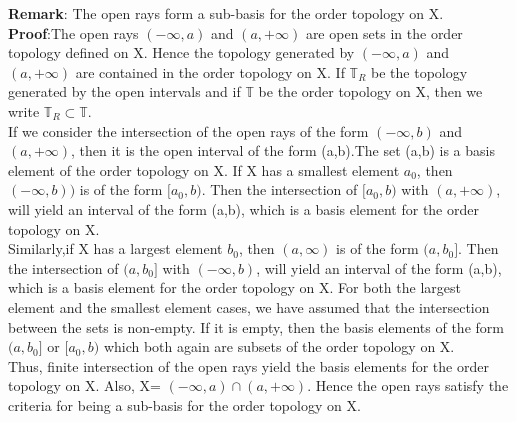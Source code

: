 \documentclass[a4paper,english,12pt]{article}
\begin{document}
\begin{flushleft}
{\bf Remark}: The open rays form a sub-basis for the order topology on X.\\
\vspace{2mm}
{\bf Proof}:The open rays $(-\infty,a)$ and $(a,+\infty)$ are open sets in the order topology defined on X. Hence the topology generated by $(-\infty,a)$ and $(a,+\infty)$ are contained in the order topology on X. If $\mathbb{T}_R$ be the topology generated by the open intervals and if $\mathbb{T}$ be the order topology on X, then we write $ \mathbb{T}_R\subset \mathbb{T}$. \\
\vspace{1mm}
If we consider the intersection of the open rays of the form $(-\infty,b)$ and $(a,+\infty)$, then it is the open interval of the form (a,b).The set (a,b) is a basis element of the order topology on X. If X has a smallest element $a_0$, then $(-\infty,b))$ is of the form $[a_0,b)$. Then the intersection of $[a_0,b)$ with $(a,+\infty)$, will yield an interval of the form (a,b), which is a basis element for the order topology on X. \\
\vspace{1mm}
Similarly,if X has a largest element $b_0$, then $(a,\infty)$ is of the form $(a,b_0]$. Then the intersection of $(a,b_0]$ with $(-\infty,b)$, will yield an interval of the form (a,b), which is a basis element for the order topology on X. For both the largest element and the smallest element cases, we have assumed that the intersection between the sets is non-empty. If it is empty, then the basis elements of the form $(a,b_0]$ or $[a_0,b)$ which both again are subsets of the order topology on X.\\
Thus, finite intersection of the open rays yield the basis elements for the order topology on X. Also, X= $(-\infty,a) \cap (a,+\infty)$. Hence the open rays satisfy the criteria for being a sub-basis for the order topology on X.
\vspace{3mm}


\end{flushleft}
\end{document}
